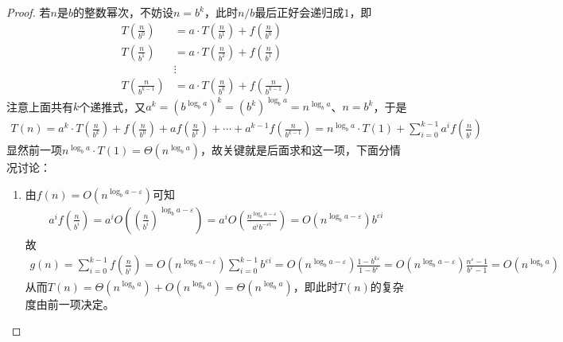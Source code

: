 \documentclass{ctexart}
\begin{document}
\begin{proof}
    若$n$是$b$的整数幂次，不妨设$n = b^k$，此时$n/b$最后正好会递归成$1$，即
    \begin{align*}
        T \left( \frac{n}{b^0} \right)     & = a \cdot T \left( \frac{n}{b^1} \right) + f \left( \frac{n}{b^0} \right)     \\
        T \left( \frac{n}{b^1} \right)     & = a \cdot T \left( \frac{n}{b^2} \right) + f \left( \frac{n}{b^1} \right)     \\
                                           & \vdots                                                                        \\
        T \left( \frac{n}{b^{k-1}} \right) & = a \cdot T \left( \frac{n}{b^k} \right) + f \left( \frac{n}{b^{k-1}} \right)
    \end{align*}
    注意上面共有$k$个递推式，又$a^k = (b^{\log_b a})^k = (b^k)^{\log_b a} = n^{\log_b a}$、$n = b^k$，于是
    \begin{align*}
        T(n) = a^k \cdot T \left( \frac{n}{b^k} \right) + f \left( \frac{n}{b^0} \right) + a f \left( \frac{n}{b^1} \right) + \cdots + a^{k-1} f \left( \frac{n}{b^{k-1}} \right) = n^{\log_b a} \cdot T(1) + \sum_{i=0}^{k-1} a^i f \left( \frac{n}{b^i} \right)
    \end{align*}
    显然前一项$n^{\log_b a} \cdot T(1) = \Theta(n^{\log_b a})$，故关键就是后面求和这一项，下面分情况讨论：
    \begin{enumerate}
        \item 由$f(n) = O(n^{\log_b a - \varepsilon})$可知
              \begin{align*}
                  a^i f \left( \frac{n}{b^i} \right) = a^i O \left( \left( \frac{n}{b^i} \right)^{\log_b a - \varepsilon} \right) = a^i O \left( \frac{n^{\log_b a - \varepsilon}}{a^i b^{-\varepsilon i}} \right) = O(n^{\log_b a - \varepsilon}) b^{\varepsilon i}
              \end{align*}
              故
              \begin{align*}
                  g(n) = \sum_{i=0}^{k-1} f \left( \frac{n}{b^i} \right) = O(n^{\log_b a - \varepsilon}) \sum_{i=0}^{k-1} b^{\varepsilon i} = O(n^{\log_b a - \varepsilon}) \frac{1 - b^{k \varepsilon}}{1 - b^\varepsilon} = O(n^{\log_b a - \varepsilon}) \frac{n^\varepsilon - 1}{b^\varepsilon - 1} = O(n^{\log_b a})
              \end{align*}
              从而$T(n) = \Theta(n^{\log_b a}) + O(n^{\log_b a}) = \Theta(n^{\log_b a})$，即此时$T(n)$的复杂度由前一项决定。


\end{enumerate}
\end{proof}
\end{document}

